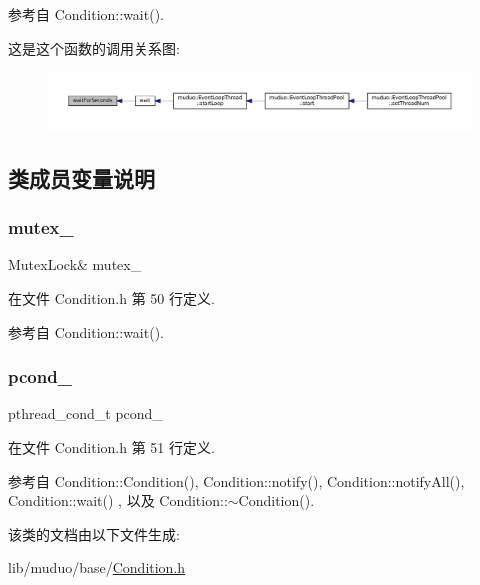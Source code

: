 参考自 Condition\+::wait().

这是这个函数的调用关系图\+:
\nopagebreak
\begin{figure}[H]
\begin{center}
\leavevmode
\includegraphics[width=350pt]{classmuduo_1_1Condition_a73adc43213ab6f784ca7c47923907ac2_icgraph}
\end{center}
\end{figure}


\subsection{类成员变量说明}
\mbox{\label{classmuduo_1_1Condition_a06a4780af4c6dd060869c14027ee8055}} 
\subsubsection{\texorpdfstring{mutex\+\_\+}{mutex\_}}
{\footnotesize\ttfamily Mutex\+Lock\& mutex\+\_\+\hspace{0.3cm}{\ttfamily [private]}}



在文件 Condition.\+h 第 50 行定义.



参考自 Condition\+::wait().

\mbox{\label{classmuduo_1_1Condition_a092da37dcd38b596795e369da99d2b82}} 
\subsubsection{\texorpdfstring{pcond\+\_\+}{pcond\_}}
{\footnotesize\ttfamily pthread\+\_\+cond\+\_\+t pcond\+\_\+\hspace{0.3cm}{\ttfamily [private]}}



在文件 Condition.\+h 第 51 行定义.



参考自 Condition\+::\+Condition(), Condition\+::notify(), Condition\+::notify\+All(), Condition\+::wait() , 以及 Condition\+::$\sim$\+Condition().



该类的文档由以下文件生成\+:\begin{DoxyCompactItemize}
\item 
lib/muduo/base/\hyperlink{Condition_8h}{Condition.\+h}\end{DoxyCompactItemize}
